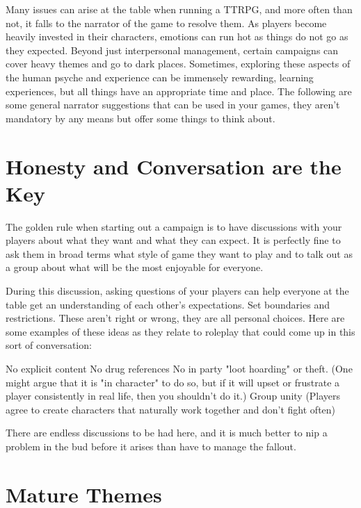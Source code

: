 Many issues can arise at the table when running a TTRPG, and more often than not, it falls to the narrator of the game to resolve them. As players become heavily invested in their characters, emotions can run hot as things do not go as they expected. Beyond just interpersonal management, certain campaigns can cover heavy themes and go to dark places. Sometimes, exploring these aspects of the human psyche and experience can be immensely rewarding, learning experiences, but all things have an appropriate time and place. The following are some general narrator suggestions that can be used in your games, they aren’t mandatory by any means but offer some things to think about.

\section{Honesty and Conversation are the Key}

The golden rule when starting out a campaign is to have discussions with your players about what they want and what they can expect. It is perfectly fine to ask them in broad terms what style of game they want to play and to talk out as a group about what will be the most enjoyable for everyone.

During this discussion, asking questions of your players can help everyone at the table get an understanding of each other’s expectations. Set boundaries and restrictions. These aren’t right or wrong, they are all personal choices. Here are some examples of these ideas as they relate to roleplay that could come up in this sort of conversation:

\begin{displayquote}
    No explicit content
    No drug references
    No in party "loot hoarding" or theft. (One might argue that it is "in character" to do so, but if it will upset or frustrate a player consistently in real life, then you shouldn't do it.)
    Group unity (Players agree to create characters that naturally work together and don't fight often)
\end{displayquote}

There are endless discussions to be had here, and it is much better to nip a problem in the bud before it arises than have to manage the fallout.

\section{Mature Themes}


